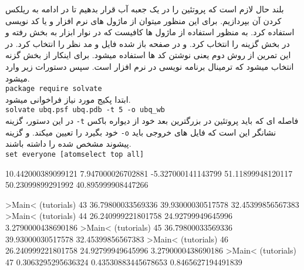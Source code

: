 


‌بلند
حال لازم است که پروتئین را در یک جعبه آب قرار بدهیم تا در ادامه به ریلکس کردن آن بپردازیم. برای این منظور میتوان از ماژول های نرم افزار  و یا کد نویسی استفاده کرد. به منظور استفاده از ماژول ها کافیست که در نوار ابزار به بخش  رفته و در بخش  گزینه  را انتخاب کرد. و در صفحه باز شده فایل  و  مد نظر را انتخاب کرد.
در این تمرین از روش دوم یعنی نوشتن کد ها استفاده میشود. برای اینکار از بخش  گزنه  انتخاب میشود که ترمینال برنامه نویسی در نرم افزار  است. سپس دستورات زیر وارد میشود.\\
\verb|package require solvate|\\
ابتدا پکیج مورد نیاز فراخوانی میشود.\\
\verb|solvate ubq.psf ubq.pdb -t 5 -o ubq_wb|\\
در این دستور، گزینه \verb*|-t| فاصله ای که باید پروتئین در بزرگترین بعد خود از دیواره باکس خود بگیرد را تعیین میکند. و گزینه \verb*|-o| نشانگر این است که فایل های خروجی باید پیشوند مشخص شده را داشته باشند.\\
\verb|set everyone [atomselect top all]|

{10.442000389099121 7.947000026702881 -5.327000141143799} {51.11899948120117 50.23099899291992 40.895999908447266}



>Main< (tutorials) 43 %
36.79800033569336 39.93000030517578 32.45399856567383
>Main< (tutorials) 44 %
26.240999221801758 24.92799949645996 3.2790000438690186
>Main< (tutorials) 45 %
36.79800033569336 39.93000030517578 32.45399856567383
>Main< (tutorials) 46 %
26.240999221801758 24.92799949645996 3.2790000438690186
>Main< (tutorials) 47 %
0.3063295295636324 0.43530883445678653 0.8465627194491839


